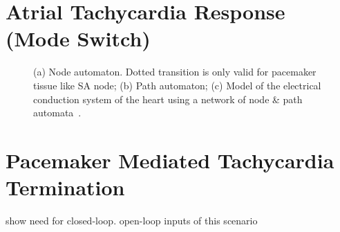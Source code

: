 \documentclass[openany]{now} %
\begin{document}
\section{Atrial Tachycardia Response (Mode Switch)}
\begin{figure}[!t]
\centering
		
\caption{\small (a) Node automaton. Dotted transition is only valid for pacemaker tissue like SA node; (b) Path automaton; (c) Model of the electrical conduction system of the heart using a network of node \& path automata~\cite{vhm_ecrts10}.}
\end{figure} 

\section{Pacemaker Mediated Tachycardia Termination}
show need for closed-loop. open-loop inputs of this scenario
\end{document}
